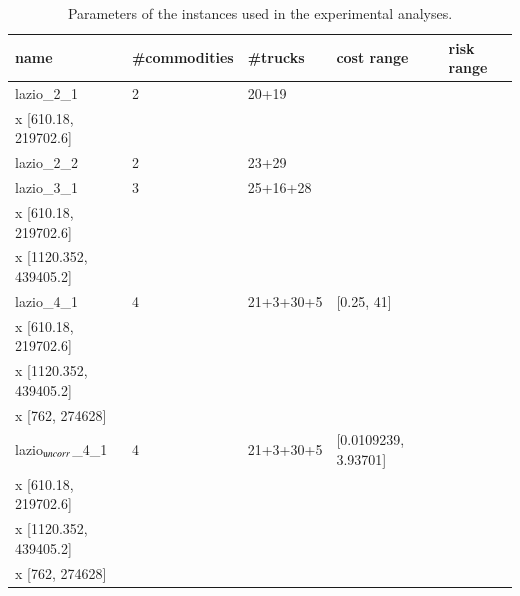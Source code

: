 \documentclass[preprint,12pt]{elsarticle}
\begin{document}
\begin{table}
\caption{\label{tab:instances} Parameters of the instances used in the experimental analyses.}
\begin{tabular}{lllll}
	\toprule
	name & \begin{minipage}{1cm}\#com\-mod\-i\-ties\end{minipage} & \#trucks & cost range & risk range \\ \midrule
	lazio\_2\_1 & 2 & \small 20+19         & & \begin{minipage}[t]{3.7cm} \small [762, 274628]\\ x [610.18, 219702.6]\end{minipage}\\
	lazio\_2\_2 & 2 & \small 23+29         & & \\
	lazio\_3\_1 & 3 & \small 25+16+28      & & \begin{minipage}[t]{3.7cm} \small [762, 274628]\\ x [610.18, 219702.6]\\ x [1120.352, 439405.2]\end{minipage}\\
	lazio\_4\_1 & 4 & \small 21+3+30+5     & \small [0.25, 41] & \begin{minipage}[t]{3.7cm} \small [762, 274628]\\ x [610.18, 219702.6]\\ x [1120.352, 439405.2]\\ x [762, 274628]\end{minipage}\\
	lazio$_{\text uncorr}$\_4\_1 & 4 & \small 21+3+30+5     & \small [0.0109239, 3.93701] & \begin{minipage}[t]{3.7cm} \small [762, 274628]\\ x [610.18, 219702.6]\\ x [1120.352, 439405.2]\\ x [762, 274628]\end{minipage}\\
	\bottomrule
\end{tabular}
\end{table}


\end{document}
